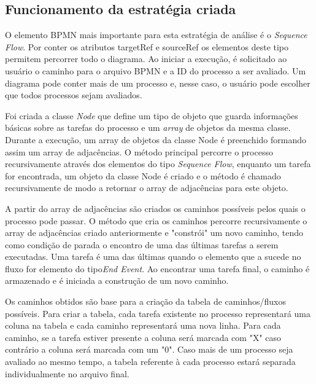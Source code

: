 \documentclass[12pt]{article}
\begin{document}

\subsection{Funcionamento da estratégia criada}


O elemento BPMN mais importante para esta estratégia de análise é o \emph{Sequence Flow}. Por conter os atributos targetRef e sourceRef os elementos deste tipo permitem percorrer todo o diagrama. Ao iniciar a execução, é solicitado ao usuário o caminho para o arquivo BPMN e a ID do processo a ser avaliado. Um diagrama pode conter mais de um processo e, nesse caso, o usuário pode escolher que todos processos sejam avaliados.

Foi criada a classe \emph{Node} que define um tipo de objeto que guarda informações básicas sobre as tarefas do processo e um \emph{array} de objetos da mesma classe. Durante a execução, um array de objetos da classe Node é preenchido formando assim um array de adjacências. O método principal percorre o processo recursivamente através dos elementos do tipo \emph{Sequence Flow}, enquanto um tarefa for encontrada, um objeto da classe Node é criado e o método é chamado recursivamente de modo a retornar o array de adjacências para este objeto.

A partir do array de adjacências são criados os caminhos possíveis pelos quais o processo pode passar. O método que cria os caminhos percorre recursivamente o array de adjacências criado anteriormente e "constrói" um novo caminho, tendo como condição de parada o encontro de uma das últimas tarefas a serem executadas. Uma tarefa é uma das últimas quando o elemento que a sucede no fluxo for elemento do tipo\emph{End Event}. Ao encontrar uma tarefa final, o caminho é armazenado e é iniciada a construção de um novo caminho.

Os caminhos obtidos são base para a criação da tabela de caminhos/fluxos possíveis. Para criar a tabela, cada tarefa existente no processo representará uma coluna na tabela e cada caminho representará uma nova linha. Para cada caminho, se a tarefa estiver presente a coluna será marcada com "X" caso contrário a coluna será marcada com um "0". Caso mais de um processo seja avaliado ao mesmo tempo, a tabela referente à cada processo estará separada individualmente no arquivo final. 
\end{document}
